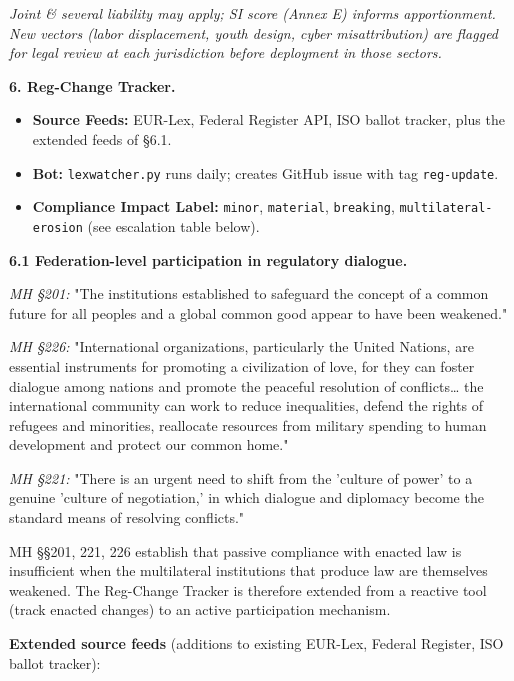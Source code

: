 \documentclass[11pt]{article}
\begin{document}
\textit{Joint \& several liability may apply; SI score (Annex E) informs apportionment. New vectors (labor displacement, youth design, cyber misattribution) are flagged for legal review at each jurisdiction before deployment in those sectors.}


\textbf{6. Reg-Change Tracker.}


\begin{itemize}\setlength\itemsep{0pt}
\item \textbf{Source Feeds:} EUR-Lex, Federal Register API, ISO ballot tracker, plus the extended feeds of §6.1.
\item \textbf{Bot:} \texttt{lexwatcher.py} runs daily; creates GitHub issue with tag \texttt{reg-update}.
\item \textbf{Compliance Impact Label:} \texttt{minor}, \texttt{material}, \texttt{breaking}, \texttt{multilateral-erosion} (see escalation table below).
\end{itemize}


\textbf{6.1 Federation-level participation in regulatory dialogue.}


\textit{MH §201:} "The institutions established to safeguard the concept of a common future for all peoples and a global common good appear to have been weakened."


\textit{MH §226:} "International organizations, particularly the United Nations, are essential instruments for promoting a civilization of love, for they can foster dialogue among nations and promote the peaceful resolution of conflicts… the international community can work to reduce inequalities, defend the rights of refugees and minorities, reallocate resources from military spending to human development and protect our common home."


\textit{MH §221:} "There is an urgent need to shift from the 'culture of power' to a genuine 'culture of negotiation,' in which dialogue and diplomacy become the standard means of resolving conflicts."


MH §§201, 221, 226 establish that passive compliance with enacted law is insufficient when the multilateral institutions that produce law are themselves weakened. The Reg-Change Tracker is therefore extended from a reactive tool (track enacted changes) to an active participation mechanism.


\textbf{Extended source feeds} (additions to existing EUR-Lex, Federal Register, ISO ballot tracker):
\end{document}
